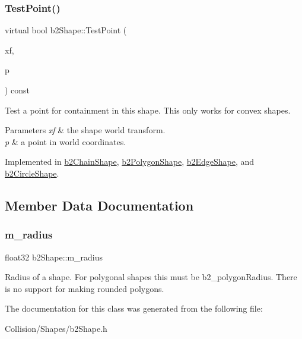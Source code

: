 \subsubsection{\texorpdfstring{Test\+Point()}{TestPoint()}}
{\footnotesize\ttfamily virtual bool b2\+Shape\+::\+Test\+Point (\begin{DoxyParamCaption}\item[{const \mbox{\hyperlink{structb2Transform}{b2\+Transform}} \&}]{xf,  }\item[{const \mbox{\hyperlink{structb2Vec2}{b2\+Vec2}} \&}]{p }\end{DoxyParamCaption}) const\hspace{0.3cm}{\ttfamily [pure virtual]}}

Test a point for containment in this shape. This only works for convex shapes. 
\begin{DoxyParams}{Parameters}
{\em xf} & the shape world transform. \\
\hline
{\em p} & a point in world coordinates. \\
\hline
\end{DoxyParams}


Implemented in \mbox{\hyperlink{classb2ChainShape_afd03c8679f18f9962a6c76bde629c62a}{b2\+Chain\+Shape}}, \mbox{\hyperlink{classb2PolygonShape_a129c4ac76727fe02724f675e3fef7fe5}{b2\+Polygon\+Shape}}, \mbox{\hyperlink{classb2EdgeShape_a15151673cf9ad585779c70363425f470}{b2\+Edge\+Shape}}, and \mbox{\hyperlink{classb2CircleShape_a84e22b3807e84b72f2981010fc197099}{b2\+Circle\+Shape}}.



\subsection{Member Data Documentation}
\mbox{\label{classb2Shape_a5de7a9bd3f9e72ef7025a65c304aaf1a}} 
\subsubsection{\texorpdfstring{m\+\_\+radius}{m\_radius}}
{\footnotesize\ttfamily float32 b2\+Shape\+::m\+\_\+radius}

Radius of a shape. For polygonal shapes this must be b2\+\_\+polygon\+Radius. There is no support for making rounded polygons. 

The documentation for this class was generated from the following file\+:\begin{DoxyCompactItemize}
\item 
Collision/\+Shapes/b2\+Shape.\+h\end{DoxyCompactItemize}
